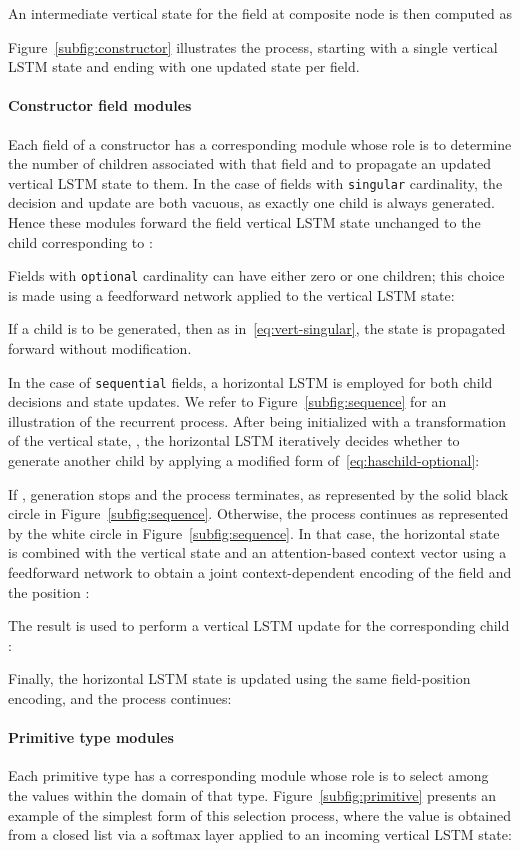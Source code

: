 \documentclass[11pt,a4paper]{article}
\newcommand{\singular}{{\tt singular}\xspace}
\newcommand{\optional}{{\tt optional}\xspace}
\newcommand{\sequential}{{\tt sequential}\xspace}
\begin{document}
An intermediate vertical state for the field  at composite node  is then computed as

Figure~\ref{subfig:constructor} illustrates the process, starting with a single vertical LSTM state and ending with one updated state per field.

\paragraph{Constructor field modules} Each field  of a constructor has a corresponding module whose role is to determine the number of children associated with that field and to propagate an updated vertical LSTM state to them. In the case of fields with \singular cardinality, the decision and update are both vacuous, as exactly one child is always generated. Hence these modules forward the field vertical LSTM state  unchanged to the child  corresponding to :

Fields with \optional cardinality can have either zero or one children; this choice is made using a feedforward network applied to the vertical LSTM state:

If a child is to be generated, then as in~\eqref{eq:vert-singular}, the state is propagated forward without modification.

In the case of \sequential fields, a horizontal LSTM is employed for both child decisions and state updates. We refer to Figure~\ref{subfig:sequence} for an illustration of the recurrent process. After being initialized with a transformation of the vertical state, , the horizontal LSTM iteratively decides whether to generate another child by applying a modified form of~\eqref{eq:haschild-optional}:

If , generation stops and the process terminates, as represented by the solid black circle in Figure~\ref{subfig:sequence}. Otherwise, the process continues as represented by the white circle in Figure~\ref{subfig:sequence}. In that case, the horizontal state  is combined with the vertical state  and an attention-based context vector  using a feedforward network  to obtain a joint context-dependent encoding of the field  and the position :

The result is used to perform a vertical LSTM update for the corresponding child :

Finally, the horizontal LSTM state is updated using the same field-position encoding, and the process continues:




\paragraph{Primitive type modules} Each primitive type  has a corresponding module whose role is to select among the values  within the domain of that type. Figure~\ref{subfig:primitive} presents an example of the simplest form of this selection process, where the value  is obtained from a closed list via a softmax layer applied to an incoming vertical LSTM state:
\end{document}
